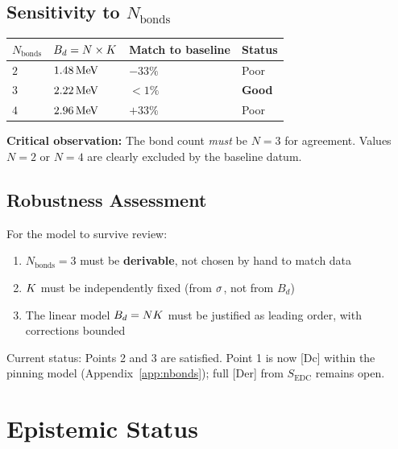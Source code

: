 \subsection{Sensitivity to $N_{\text{bonds}}$}

\begin{center}
\begin{tabular}{llll}
\toprule
$N_{\text{bonds}}$ & $B_d = N \times K$ & Match to baseline & Status \\
\midrule
$2$ & $1.48\,\mathrm{MeV}$ & $-33\%$ & Poor \\
$3$ & $2.22\,\mathrm{MeV}$ & $< 1\%$ & \textbf{Good} \\
$4$ & $2.96\,\mathrm{MeV}$ & $+33\%$ & Poor \\
\bottomrule
\end{tabular}
\end{center}

\textbf{Critical observation:} The bond count \emph{must} be $N = 3$ for
agreement. Values $N = 2$ or $N = 4$ are clearly excluded by the baseline
datum.

\subsection{Robustness Assessment}

\begin{edcopenbox}[title=What Must Be True]
    For the model to survive review:
    \begin{enumerate}
        \item $N_{\text{bonds}} = 3$ must be \textbf{derivable}, not chosen
              by hand to match data
        \item $K$ must be independently fixed (from $\sigma$, not from
              $B_d$)
        \item The linear model $B_d = NK$ must be justified as leading
              order, with corrections bounded
    \end{enumerate}

    Current status: Points 2 and 3 are satisfied. Point 1 is now [Dc]
    within the pinning model (Appendix~\ref{app:nbonds}); full [Der]
    from $S_{\text{EDC}}$ remains open.
\end{edcopenbox}

\section{Epistemic Status}
\label{sec:d:epistemic}


